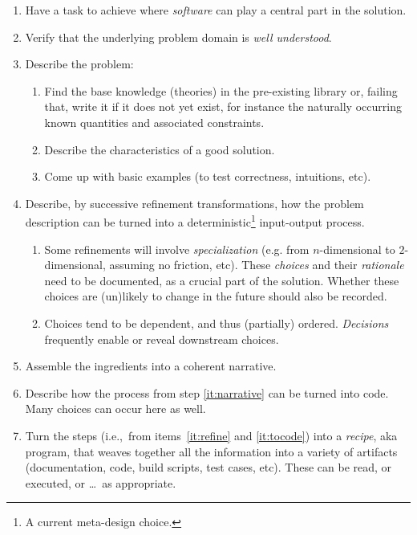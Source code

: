 \documentclass[a4paper,UKenglish,cleveref,autoref,thm-restate]{oasics-v2021}
\begin{document}
\begin{enumerate}
\item\label{it:problem} Have a task to achieve where \emph{software} can
play a central part in the solution.
\item\label{it:understood} Verify that the underlying problem domain is \emph{well
understood}.
\item\label{it:probdesc} Describe the problem:
  \begin{enumerate}
  \item Find the base knowledge (theories) in the pre-existing library or,
    failing that, write it if it does not yet exist, for instance the
    naturally occurring known quantities and associated constraints.
  \item Describe the characteristics of a good solution.
  \item Come up with basic examples (to test correctness, intuitions, etc).
  \end{enumerate}
\item\label{it:refine} Describe, by successive refinement transformations,
how the problem description can be turned into a deterministic\footnote{A current
meta-design choice.} input-output process.
  \begin{enumerate}
  \item Some refinements will involve \emph{specialization} (e.g. from
    \(n\)-dimensional to \(2\)-dimensional, assuming no friction, etc).  These
    \emph{choices} and their \emph{rationale} need to be documented, as a
    crucial part of the solution.  Whether these choices are (un)likely to
    change in the future should also be recorded.
  \item Choices tend to be dependent, and thus (partially) ordered.
   \emph{Decisions} frequently enable or reveal downstream choices.
  \end{enumerate}
\item\label{it:narrative} Assemble the ingredients into a coherent narrative.
\item\label{it:tocode} Describe how the process from step \ref{it:narrative}
can be turned into code. Many choices can occur here as well.
\item\label{it:recipe} Turn the steps (i.e.,\ from items~\ref{it:refine} and
\ref{it:tocode}) into a \emph{recipe}, aka program, that weaves together all
the information into a variety of artifacts (documentation, code, build
scripts, test cases, etc). These can be read, or executed, or \ldots\, as
appropriate.
\end{enumerate}
\end{document}
